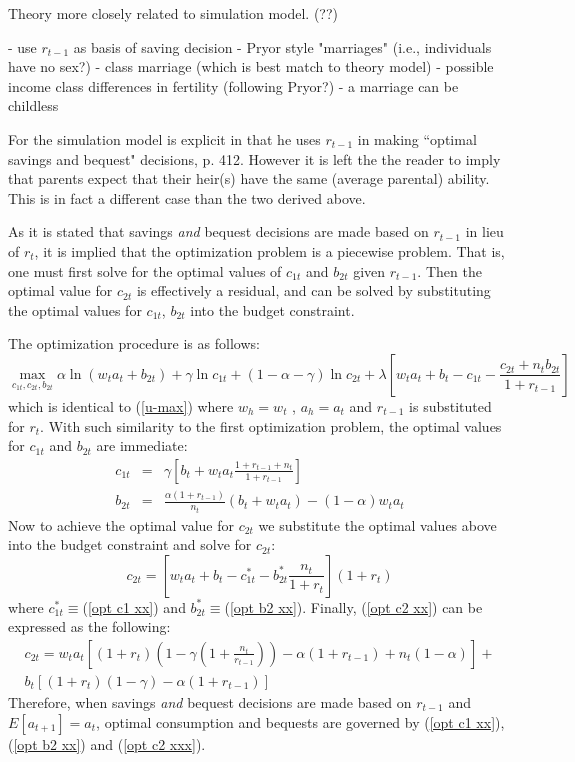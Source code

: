\documentclass{article}
\begin{document}
Theory more closely related to simulation model. (??)

- use $r_{t-1}$ as basis of saving decision
- Pryor style "marriages" (i.e., individuals have no sex?)
- class marriage (which is best match to theory model)
- possible income class differences in fertility (following Pryor?)
- a marriage can be childless

For the simulation model \citet{pestieau-1984-oep} is explicit in that he uses $r_{t-1}$ in making ``optimal savings and bequest" decisions, p. 412.  However it is left the the reader to imply that parents expect that their heir(s) have the same (average parental) ability.  This is in fact a different case than the two derived above.

As it is stated that savings \emph{and} bequest decisions are made based on $r_{t-1}$ in lieu of $r_t$, it is implied that the optimization problem is a piecewise problem.  That is, one must first solve for the optimal values of $c_{1t}$ and $b_{2t}$ given $r_{t-1}$.  Then the optimal value for $c_{2t}$ is effectively a residual, and can be solved by substituting the optimal values for $c_{1t}$, $b_{2t}$ into the budget constraint.

The optimization procedure is as follows:
\begin{equation}
\max_{c_{1t}, c_{2t}, b_{2t}}
\alpha \ln (w_t a_t+ b_{2t})
+ \gamma \ln c_{1t}
+ (1-\alpha-\gamma) \ln c_{2t}
+ \lambda [w_t a_t + b_t - c_{1t} - \frac{c_{2t} + n_t b_{2t}}{1+r_{t-1}}]
\end{equation}
which is identical to (\ref{u-max}) where $w_h = w_t$ , $a_h = a_t$ and  $r_{t-1}$ is substituted for $r_t$.  With such similarity to the first optimization problem, the optimal values for $c_{1t}$ and $b_{2t}$ are immediate:
\begin{eqnarray}
c_{1t} &=& \gamma[b_t + w_t a_t \frac{1+r_{t-1} +n_t} {1+r_{t-1}}]\label{opt c1 xx}\\
b_{2t} &=& \frac{\alpha(1+r_{t-1})}{n_t}(b_t+w_t a_t)-(1-\alpha)w_t a_t \label{opt b2 xx}
\end{eqnarray}\newline
Now to achieve the optimal value for $c_{2t}$ we substitute the optimal values above into the budget constraint and solve for $c_{2t}$:
\begin{equation}\label{opt c2 xx}
c_{2t} = [w_t a_t + b_t - c^{*}_{1t} - b^{*}_{2t}\frac{n_t}{1+r_{t}}](1+r_{t})
\end{equation}
where $c^{*}_{1t}\equiv$(\ref{opt c1 xx}) and $b^{*}_{2t} \equiv$(\ref{opt b2 xx}).  Finally, (\ref{opt c2 xx}) can be expressed as the following:
\begin{equation}\label{opt c2 xxx}
\begin{split}
c_{2t} = w_t a_t [(1+r_t)(1-\gamma(1+\frac{n_t}{r_{t-1}})) - \alpha(1+r_{t-1}) + n_t(1-\alpha)] + \\
b_t[(1+r_t)(1-\gamma)-\alpha(1+r_{t-1})]
\end{split}
\end{equation}
Therefore, when savings \emph{and} bequest decisions are made based on $r_{t-1}$ and $E[a_{t+1}] = a_t$, optimal consumption and bequests are governed by (\ref{opt c1 xx}),(\ref{opt b2 xx}) and (\ref{opt c2 xxx}).\newline
\end{document}
